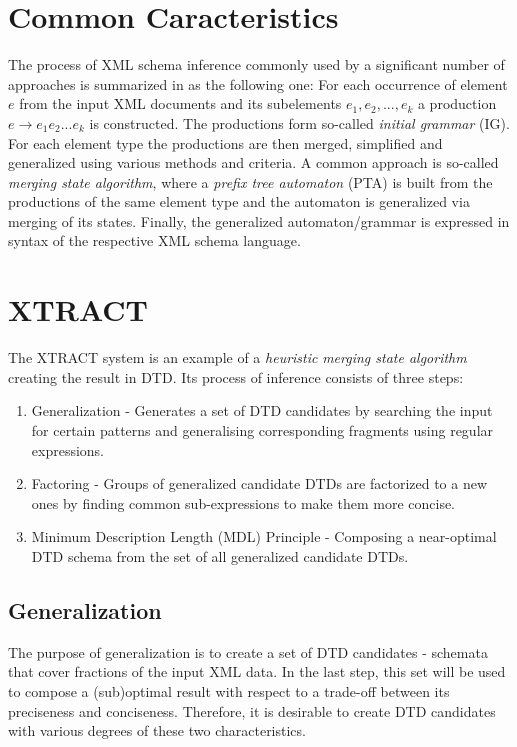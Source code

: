 \section{Common Caracteristics}
The process of XML schema inference commonly used by a significant number of approaches is summarized in \cite{Mlynkova:2008:AAX:1494650.1495496} as the following one: For each occurrence of element $e$ from the input XML documents and its subelements $e_1, e_2, ..., e_k$ a production $e \rightarrow e_1 e_2 ... e_k$ is constructed. The productions form so-called \emph{initial grammar} (IG). For each element type the productions are then merged, simplified and generalized using various methods and criteria. A common approach is so-called \emph{merging state algorithm}, where a \emph{prefix tree automaton} (PTA) is built from the productions of the same element type and the automaton is generalized via merging of its states. Finally, the generalized automaton/grammar is expressed in syntax of the respective XML schema language.

\section{XTRACT} \label{section_xtract}
The XTRACT \cite{Garofalakis:2000:XSE:342009.335409} system is an example of a \emph{heuristic} \emph{merging state algorithm} creating the result in DTD. Its process of inference consists of three steps:
\begin{enumerate}
\item Generalization - Generates a set of DTD candidates by searching the input for certain patterns and generalising corresponding fragments using regular expressions.
\item Factoring - Groups of generalized candidate DTDs are factorized to a new ones by finding common sub-expressions to make them more concise.
\item Minimum Description Length (MDL) Principle - Composing a near-optimal DTD schema from the set of all generalized candidate DTDs.
\end{enumerate}

\subsection{Generalization}
The purpose of generalization is to create a set of DTD candidates - schemata that cover fractions of the input XML data. In the last step, this set will be used to compose a (sub)optimal result with respect to a trade-off between its preciseness and conciseness. Therefore, it is desirable to create DTD candidates with various degrees of these two characteristics.


